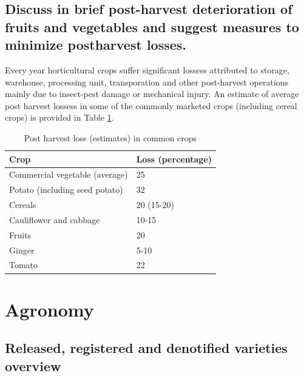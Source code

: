 \documentclass[
  openany]{book}
\begin{document}
\hypertarget{discuss-in-brief-post-harvest-deterioration-of-fruits-and-vegetables-and-suggest-measures-to-minimize-postharvest-losses.}{%
\section{Discuss in brief post-harvest deterioration of fruits and vegetables and suggest measures to minimize postharvest losses.}\label{discuss-in-brief-post-harvest-deterioration-of-fruits-and-vegetables-and-suggest-measures-to-minimize-postharvest-losses.}}

Every year horticultural crops suffer significant lossess attributed to storage, warehouse, processing unit, transporation and other post-harvest operations mainly due to insect-pest damage or mechanical injury. An estimate of average post harvest lossess in some of the commonly marketed crops (including cereal crops) is provided in Table \ref{tab:post-harvest-loss-table}.

\begin{table}

\caption{\label{tab:post-harvest-loss-table}Post harvest loss (estimates) in common crops}
\centering
\begin{tabular}[t]{ll}
\toprule
Crop & Loss (percentage)\\
\midrule
Commercial vegetable (average) & 25\\
Potato (including seed potato) & 32\\
Cereals & 20 (15-20)\\
Cauliflower and cabbage & 10-15\\
Fruits & 20\\
\addlinespace
Ginger & 5-10\\
Tomato & 22\\
\bottomrule
\end{tabular}
\end{table}

\hypertarget{agronomy}{%
\chapter{Agronomy}\label{agronomy}}

\hypertarget{released-registered-and-denotified-varieties-overview}{%
\section{Released, registered and denotified varieties overview}\label{released-registered-and-denotified-varieties-overview}}
\end{document}
